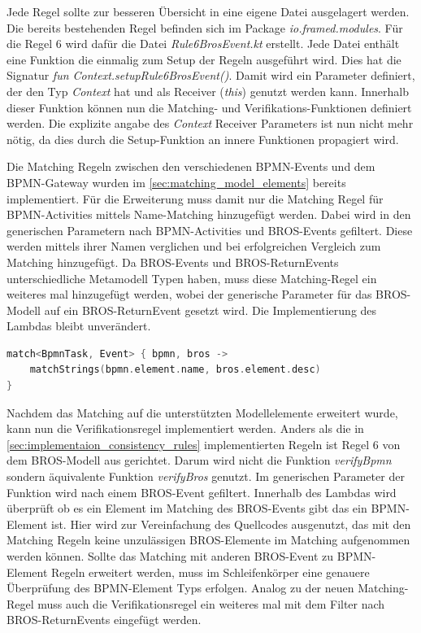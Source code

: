Jede Regel sollte zur besseren Übersicht in eine eigene Datei ausgelagert werden.
Die bereits bestehenden Regel befinden sich im Package \emph{io.framed.modules}.
Für die Regel 6 wird dafür die Datei \emph{Rule6BrosEvent.kt} erstellt.
Jede Datei enthält eine Funktion die einmalig zum Setup der Regeln ausgeführt wird.
Dies hat die Signatur \emph{fun Context.setupRule6BrosEvent()}.
Damit wird ein Parameter definiert, der den Typ \emph{Context} hat und als Receiver (\emph{this}) genutzt werden kann.
Innerhalb dieser Funktion können nun die Matching- und Verifikations-Funktionen definiert werden.
Die explizite angabe des \emph{Context} Receiver Parameters ist nun nicht mehr nötig, da dies durch die Setup-Funktion an innere Funktionen propagiert wird. 

Die Matching Regeln zwischen den verschiedenen BPMN-Events und dem BPMN-Gateway wurden im \cref{sec:matching_model_elements} bereits implementiert.
Für die Erweiterung muss damit nur die Matching Regel für BPMN-Activities mittels Name-Matching hinzugefügt werden.
Dabei wird in den generischen Parametern nach BPMN-Activities und BROS-Events gefiltert.
Diese werden mittels ihrer Namen verglichen und bei erfolgreichen Vergleich zum Matching hinzugefügt.
Da BROS-Events und BROS-ReturnEvents unterschiedliche Metamodell Typen haben, muss diese Matching-Regel ein weiteres mal hinzugefügt werden, wobei der generische Parameter für das BROS-Modell auf ein BROS-ReturnEvent gesetzt wird.
Die Implementierung des Lambdas bleibt unverändert.

\begin{lstlisting}[language=Kotlin, caption=Matching Regel zwischen BPMN-Activities und BROS-Events, label=lst:matching_activity_event]
match<BpmnTask, Event> { bpmn, bros ->
    matchStrings(bpmn.element.name, bros.element.desc)
}
\end{lstlisting}

Nachdem das Matching auf die unterstützten Modellelemente erweitert wurde, kann nun die Verifikationsregel implementiert werden.
Anders als die in \cref{sec:implementaion_consistency_rules} implementierten Regeln ist Regel 6 von dem BROS-Modell aus gerichtet.
Darum wird nicht die Funktion \emph{verifyBpmn} sondern äquivalente Funktion \emph{verifyBros} genutzt.
Im generischen Parameter der Funktion wird nach einem BROS-Event gefiltert.
Innerhalb des Lambdas wird überprüft ob es ein Element im Matching des BROS-Events gibt das ein BPMN-Element ist.
Hier wird zur Vereinfachung des Quellcodes ausgenutzt, das mit den Matching Regeln keine unzulässigen BROS-Elemente im Matching aufgenommen werden können.
Sollte das Matching mit anderen BROS-Event zu BPMN-Element Regeln erweitert werden, muss im Schleifenkörper eine genauere Überprüfung des BPMN-Element Typs erfolgen.
Analog zu der neuen Matching-Regel muss auch die Verifikationsregel ein weiteres mal mit dem Filter nach BROS-ReturnEvents eingefügt werden.

